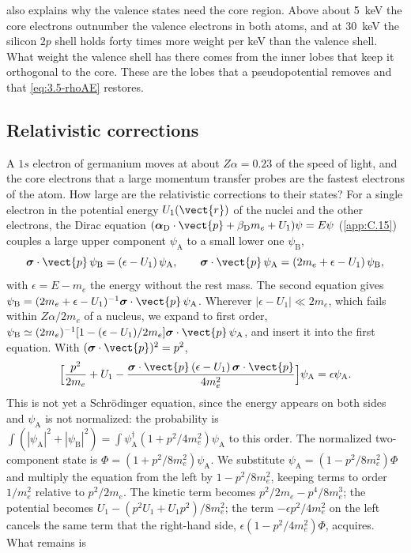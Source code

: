  also explains why the valence states need the core region. Above about \SI{5}{keV} the core electrons outnumber the valence electrons in both atoms, and at \SI{30}{keV} the silicon $2p$ shell holds forty times more weight per keV than the valence shell. What weight the valence shell has there comes from the inner lobes that keep it orthogonal to the core. These are the lobes that a pseudopotential removes and that \cref{eq:3.5-rhoAE} restores.

\subsection{Relativistic corrections}

A $1s$ electron of germanium moves at about $Z\alpha = 0.23$ of the speed of light, and the core electrons that a large momentum transfer probes are the fastest electrons of the atom. How large are the relativistic corrections to their states? For a single electron in the potential energy $U_1(\vect{r})$ of the nuclei and the other electrons, the Dirac equation $(\boldsymbol{\alpha}_{\mathrm{D}}\cdot\vect{p} + \beta_{\mathrm{D}}m_e + U_1)\psi = E\psi$ (\cref{app:C.15}) couples a large upper component $\psi_{\mathrm{A}}$ to a small lower one $\psi_{\mathrm{B}}$,
\begin{equation*}
  \boldsymbol{\sigma}\cdot\vect{p}\,\psi_{\mathrm{B}} = (\epsilon - U_1)\,\psi_{\mathrm{A}}, \qquad
  \boldsymbol{\sigma}\cdot\vect{p}\,\psi_{\mathrm{A}} = (2m_e + \epsilon - U_1)\,\psi_{\mathrm{B}} ,
\end{equation*}
with $\epsilon = E - m_e$ the energy without the rest mass. The second equation gives $\psi_{\mathrm{B}} = (2m_e + \epsilon - U_1)^{-1}\boldsymbol{\sigma}\cdot\vect{p}\,\psi_{\mathrm{A}}$. Wherever $|\epsilon - U_1| \ll 2m_e$, which fails within $Z\alpha/2m_e$ of a nucleus, we expand to first order, $\psi_{\mathrm{B}} \simeq (2m_e)^{-1}[1 - (\epsilon - U_1)/2m_e]\boldsymbol{\sigma}\cdot\vect{p}\,\psi_{\mathrm{A}}$, and insert it into the first equation. With $(\boldsymbol{\sigma}\cdot\vect{p})^2 = p^2$,
\begin{equation*}
  \Bigl[\frac{p^2}{2m_e} + U_1 - \frac{\boldsymbol{\sigma}\cdot\vect{p}\,(\epsilon - U_1)\,\boldsymbol{\sigma}\cdot\vect{p}}{4m_e^2}\Bigr]\psi_{\mathrm{A}} = \epsilon\psi_{\mathrm{A}} .
\end{equation*}
This is not yet a Schr\"odinger equation, since the energy appears on both sides and $\psi_{\mathrm{A}}$ is not normalized: the probability is $\int(|\psi_{\mathrm{A}}|^2 + |\psi_{\mathrm{B}}|^2) = \int\psi_{\mathrm{A}}^\dagger(1 + p^2/4m_e^2)\psi_{\mathrm{A}}$ to this order. The normalized two-component state is $\Phi = (1 + p^2/8m_e^2)\psi_{\mathrm{A}}$. We substitute $\psi_{\mathrm{A}} = (1 - p^2/8m_e^2)\Phi$ and multiply the equation from the left by $1 - p^2/8m_e^2$, keeping terms to order $1/m_e^2$ relative to $p^2/2m_e$. The kinetic term becomes $p^2/2m_e - p^4/8m_e^3$; the potential becomes $U_1 - (p^2U_1 + U_1p^2)/8m_e^2$; the term $-\epsilon p^2/4m_e^2$ on the left cancels the same term that the right-hand side, $\epsilon(1 - p^2/4m_e^2)\Phi$, acquires. What remains is

